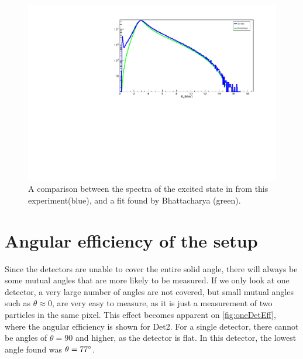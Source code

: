 \begin{figure}[h]
	\centering
	\includegraphics[width=\linewidth]{../figures/bataraCompare.pdf}
	\caption{A comparison between the spectra of the excited state in \ber from this experiment(blue), and a fit found by Bhattacharya \cite{bata} (green).}
	\label{fig:bata}
\end{figure}

\section{Angular efficiency of the setup}
Since the detectors are unable to cover the entire solid angle, there will always be some mutual angles that are more likely to be measured. 
If we only look at one detector, a very large number of angles are not covered, but small mutual angles such as $\theta \approx 0$, are very easy to measure, as it is just a measurement of two particles in the same pixel. 
This effect becomes apparent on \cref{fig:oneDetEff}, where the angular efficiency is shown for Det2. For a single detector, there cannot be angles of $\theta = 90$ and higher, as the detector is flat. In this detector, the lowest angle found was $\theta = 77\degree$.\\

